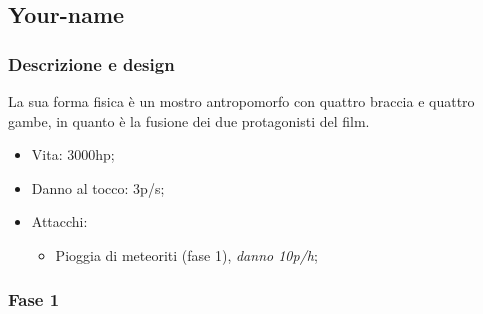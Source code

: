 \subsection{Your-name}

    \subsubsection{Descrizione e design}
        La sua forma fisica è un mostro antropomorfo con quattro braccia e quattro gambe, in quanto
        è la fusione dei due protagonisti del film.\\
        \begin{itemize}
            \item{Vita: 3000hp;}
            \item{Danno al tocco: 3p/s;}
            \item{Attacchi:
                \begin{itemize}
                    \item{Pioggia di meteoriti (fase 1), \emph{danno 10p/h};}
                \end{itemize}
            }
        \end{itemize}
    
    \subsubsection{Fase 1}
